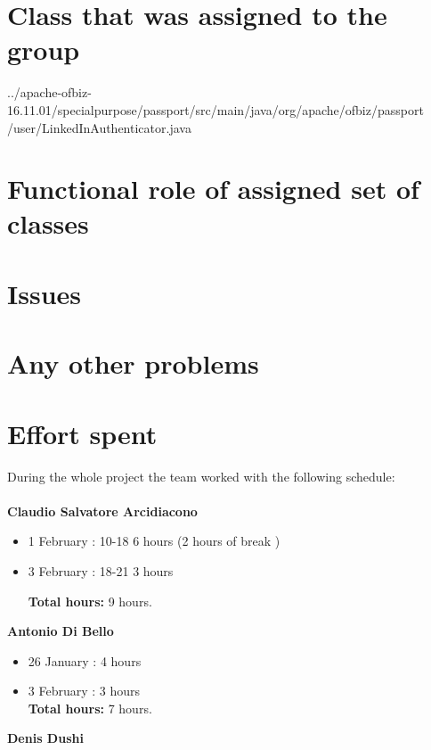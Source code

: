 \documentclass[a4paper]{article}
\begin{document}
\newpage
{}

\tableofcontents

\newpage
\section{Class that was assigned to the group} 
../apache-ofbiz-16.11.01/specialpurpose/passport/src/main/java/org/apache/ofbiz/passport\\/user/LinkedInAuthenticator.java

\section{Functional role of assigned set of classes}


\newpage
\section{Issues}


\newpage
\section{Any other problems}


\newpage
\section{Effort spent}
During the whole project the team worked with the following schedule:\\ \emph{\\}
\textbf{Claudio Salvatore Arcidiacono}
\begin{itemize}
\item 1 February : 10-18 6 hours (2 hours of break )
\item 3 February : 18-21 3 hours

\textbf{Total hours:} 9 hours.
\end{itemize}


\textbf{Antonio Di Bello}
\begin{itemize}
\item 26 January :  4 hours
\item 3 February :  3 hours\\

\textbf{Total hours:} 7 hours.
\end{itemize}


\textbf{Denis Dushi}
\end{document}
